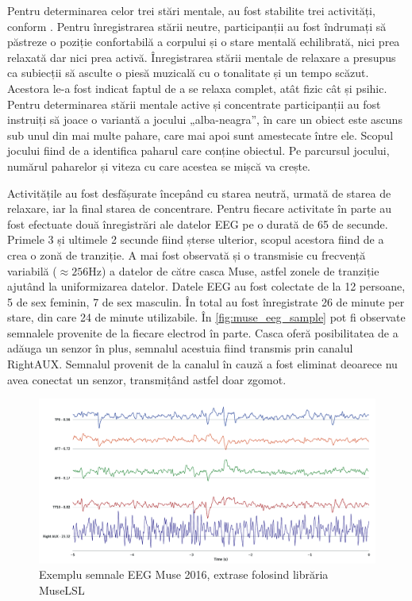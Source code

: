 Pentru determinarea celor trei stări mentale, au fost stabilite trei activități, conform \cite{eeg:2018}. Pentru înregistrarea stării neutre, participanții au fost îndrumați să păstreze o poziție confortabilă a corpului și o stare mentală echilibrată, nici prea relaxată dar nici prea activă. Înregistrarea stării mentale de relaxare a presupus ca subiecții să asculte o piesă muzicală cu o tonalitate și un tempo scăzut. Acestora le-a fost indicat faptul de a se relaxa complet, atât fizic cât și psihic. Pentru determinarea stării mentale active și concentrate participanții au fost instruiți să joace o variantă a jocului „alba-neagra”, în care un obiect este ascuns sub unul din mai multe pahare, care mai apoi sunt amestecate între ele. Scopul jocului fiind de a identifica paharul care conține obiectul. Pe parcursul jocului, numărul paharelor și viteza cu care acestea se mișcă va crește.

Activitățile au fost desfășurate începând cu starea neutră, urmată de starea de relaxare, iar la final starea de concentrare. Pentru fiecare activitate în parte au fost efectuate două înregistrări ale datelor EEG pe o durată de 65 de secunde. Primele 3 și ultimele 2 secunde fiind șterse ulterior, scopul acestora fiind de a crea o zonă de tranziție. A mai fost observată și o transmisie cu frecvență variabilă ($\approx256\si{\hertz}$) a datelor de către casca Muse, astfel zonele de tranziție ajutând la uniformizarea datelor. Datele EEG au fost colectate de la 12 persoane, 5 de sex feminin, 7 de sex masculin. În total au fost înregistrate 26 de minute per stare, din care 24 de minute utilizabile. În \autoref{fig:muse_eeg_sample} pot fi observate semnalele provenite de la fiecare electrod în parte. Casca oferă posibilitatea de a adăuga un senzor în plus, semnalul acestuia fiind transmis prin canalul RightAUX. Semnalul provenit de la canalul în cauză a fost eliminat deoarece nu avea conectat un senzor, transmițând astfel doar zgomot.

\begin{figure}[ht]
\centering
\includegraphics[width=\textwidth, keepaspectratio]{fig/cap3/museEEGplot.png}
\caption{Exemplu semnale EEG Muse 2016, extrase folosind librăria MuseLSL \cite{online:muselsl}}
\label{fig:muse_eeg_sample}
\end{figure}

